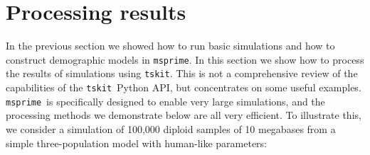 \documentclass[graybox]{svmult}
\newcommand{\msprime}[0]{\texttt{msprime}}
\newcommand{\tskit}[0]{\texttt{tskit}}
\begin{document}








\section{Processing results}\label{processing-results}

In the previous section we showed how to run basic simulations and
how to construct demographic models in \msprime. In this
section we show how to process the results of simulations using
\tskit. This is not a
comprehensive review of the capabilities of the \tskit\ Python API, but
concentrates on some useful examples.
\msprime\ is specifically designed to enable very large simulations, and
the processing methods we demonstrate below are all very efficient. To
illustrate this, we consider a simulation of 100,000 diploid samples of 10 megabases
from a simple three-population model with human-like parameters:
\end{document}
